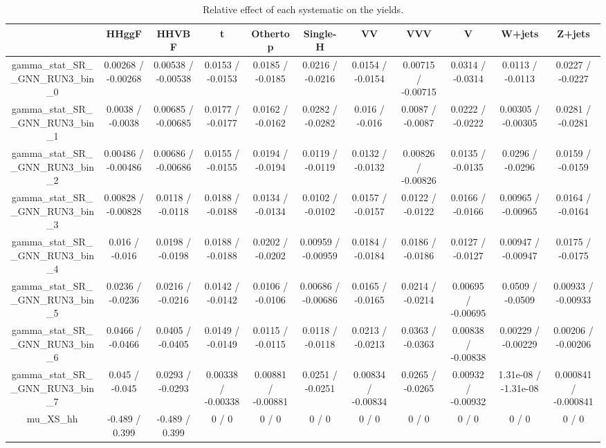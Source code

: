 \documentclass[10pt]{article}
\begin{document}
\begin{table}[htbp]
\begin{center}
\begin{tabular}{|c|c|c|c|c|c|c|c|c|c|c|}
\hline 
      & HHggF      & HHVBF      & t      & Othertop      & Single-H      & VV      & VVV      & V      & W+jets      & Z+jets \\ 
\hline 
  gamma_stat_SR__GNN_RUN3_bin_0 & 0.00268 / -0.00268 & 0.00538 / -0.00538 & 0.0153 / -0.0153 & 0.0185 / -0.0185 & 0.0216 / -0.0216 & 0.0154 / -0.0154 & 0.00715 / -0.00715 & 0.0314 / -0.0314 & 0.0113 / -0.0113 & 0.0227 / -0.0227 \\ 
  gamma_stat_SR__GNN_RUN3_bin_1 & 0.0038 / -0.0038 & 0.00685 / -0.00685 & 0.0177 / -0.0177 & 0.0162 / -0.0162 & 0.0282 / -0.0282 & 0.016 / -0.016 & 0.0087 / -0.0087 & 0.0222 / -0.0222 & 0.00305 / -0.00305 & 0.0281 / -0.0281 \\ 
  gamma_stat_SR__GNN_RUN3_bin_2 & 0.00486 / -0.00486 & 0.00686 / -0.00686 & 0.0155 / -0.0155 & 0.0194 / -0.0194 & 0.0119 / -0.0119 & 0.0132 / -0.0132 & 0.00826 / -0.00826 & 0.0135 / -0.0135 & 0.0296 / -0.0296 & 0.0159 / -0.0159 \\ 
  gamma_stat_SR__GNN_RUN3_bin_3 & 0.00828 / -0.00828 & 0.0118 / -0.0118 & 0.0188 / -0.0188 & 0.0134 / -0.0134 & 0.0102 / -0.0102 & 0.0157 / -0.0157 & 0.0122 / -0.0122 & 0.0166 / -0.0166 & 0.00965 / -0.00965 & 0.0164 / -0.0164 \\ 
  gamma_stat_SR__GNN_RUN3_bin_4 & 0.016 / -0.016 & 0.0198 / -0.0198 & 0.0188 / -0.0188 & 0.0202 / -0.0202 & 0.00959 / -0.00959 & 0.0184 / -0.0184 & 0.0186 / -0.0186 & 0.0127 / -0.0127 & 0.00947 / -0.00947 & 0.0175 / -0.0175 \\ 
  gamma_stat_SR__GNN_RUN3_bin_5 & 0.0236 / -0.0236 & 0.0216 / -0.0216 & 0.0142 / -0.0142 & 0.0106 / -0.0106 & 0.00686 / -0.00686 & 0.0165 / -0.0165 & 0.0214 / -0.0214 & 0.00695 / -0.00695 & 0.0509 / -0.0509 & 0.00933 / -0.00933 \\ 
  gamma_stat_SR__GNN_RUN3_bin_6 & 0.0466 / -0.0466 & 0.0405 / -0.0405 & 0.0149 / -0.0149 & 0.0115 / -0.0115 & 0.0118 / -0.0118 & 0.0213 / -0.0213 & 0.0363 / -0.0363 & 0.00838 / -0.00838 & 0.00229 / -0.00229 & 0.00206 / -0.00206 \\ 
  gamma_stat_SR__GNN_RUN3_bin_7 & 0.045 / -0.045 & 0.0293 / -0.0293 & 0.00338 / -0.00338 & 0.00881 / -0.00881 & 0.0251 / -0.0251 & 0.00834 / -0.00834 & 0.0265 / -0.0265 & 0.00932 / -0.00932 & 1.31e-08 / -1.31e-08 & 0.000841 / -0.000841 \\ 
  mu_XS_hh & -0.489 / 0.399 & -0.489 / 0.399 & 0 / 0 & 0 / 0 & 0 / 0 & 0 / 0 & 0 / 0 & 0 / 0 & 0 / 0 & 0 / 0 \\ 
\hline 
\end{tabular} 
\caption{Relative effect of each systematic on the yields.} 
\end{center} 
\end{table} 
\end{document}
